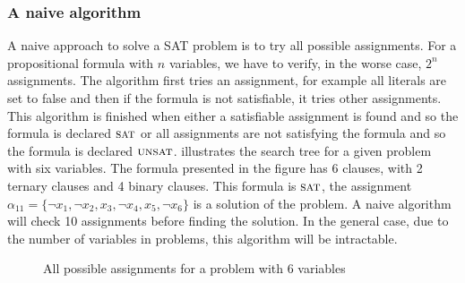 \subsubsection{A naive algorithm}
A naive approach to solve a SAT problem is to try all possible assignments.
For a propositional formula with $n$ variables, we have to verify, in the worse case, $2^n$ assignments.  
The algorithm first tries an assignment, for example all literals are set to false and then if
the formula is not satisfiable, it tries other assignments. 
This algorithm is finished when either a satisfiable assignment is found and so
the formula is declared $\textsc{sat}$  or all assignments are not satisfying the formula and so the formula is declared $\textsc{unsat}$.
 illustrates the search tree for a given problem with six variables.
The  formula presented in the figure has 6 clauses, with 2 ternary clauses and 4 binary clauses.
This formula is $\textsc{sat}$, the assignment $\alpha_{11} = \{\neg x_1, \neg x_2, x_3, \neg x_4, x_5, \neg x_6 \}$ is a solution of the problem.
A naive algorithm will check 10 assignments before finding the solution. 
In the general case, due to the number of variables in problems, this algorithm will be intractable.
\begin{figure}[!htbp]
 \centering
 
 \caption{All possible assignments for a problem with 6 variables}
 \label{fig:naive_algo}
\end{figure}
